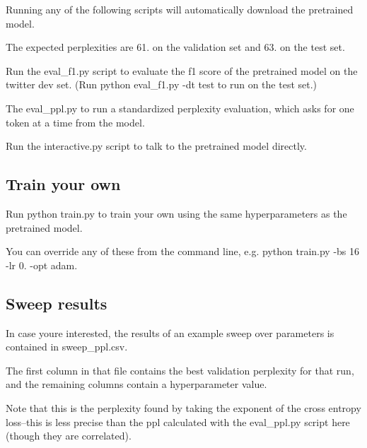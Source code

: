 Running any of the following scripts will automatically download the pretrained model.

The expected perplexities are 61. on the validation set and 63. on the test set.

Run the {\ttfamily eval\+\_\+f1.\+py} script to evaluate the f1 score of the pretrained model on the twitter dev set. (Run {\ttfamily python eval\+\_\+f1.\+py -\/dt test} to run on the test set.)

The {\ttfamily eval\+\_\+ppl.\+py} to run a standardized perplexity evaluation, which asks for one token at a time from the model.

Run the {\ttfamily interactive.\+py} script to talk to the pretrained model directly.

\subsection*{Train your own}

Run {\ttfamily python train.\+py} to train your own using the same hyperparameters as the pretrained model.

You can override any of these from the command line, e.\+g. {\ttfamily python train.\+py -\/bs 16 -\/lr 0. -\/opt adam}.

\subsection*{Sweep results}

In case you\textquotesingle{}re interested, the results of an example sweep over parameters is contained in {\ttfamily sweep\+\_\+ppl.\+csv}.

The first column in that file contains the best validation perplexity for that run, and the remaining columns contain a hyperparameter value.

Note that this is the perplexity found by taking the exponent of the cross entropy loss--this is less precise than the ppl calculated with the {\ttfamily eval\+\_\+ppl.\+py} script here (though they are correlated). 